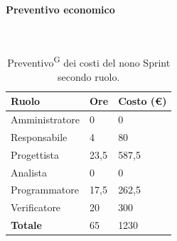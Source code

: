 \documentclass[8pt]{article}
\newcommand{\glossterm}[1]{#1\textsuperscript{G}} %
\newcommand{\subsubsubsection}[1]{\paragraph{#1}\mbox{}\\}
\begin{document}
\subsubsubsection{Preventivo economico}
    \begin{table}[ht!]
	\centering
	\begin{tabular}{p{4cm} p{1cm} p{2cm}}
        \toprule
        \textbf{Ruolo} & \textbf{Ore} & \textbf{Costo (€)} \\
        \midrule
        Amministratore & 0 & 0 \\ 
        Responsabile & 4 & 80 \\ 
        Progettista & 23,5 & 587,5 \\ 
        Analista & 0 & 0 \\ 
        Programmatore & 17,5 & 262,5 \\ 
        Verificatore & 20 & 300 \\
        \midrule 
        \textbf{Totale} & 65 & 1230 \\ 
        \bottomrule
    \end{tabular}
    \caption{\glossterm{Preventivo} dei costi del nono Sprint secondo ruolo.}
	\label{table:Preventivo dei costi del nono Sprint secondo ruolo}
\end{table}
\end{document}
